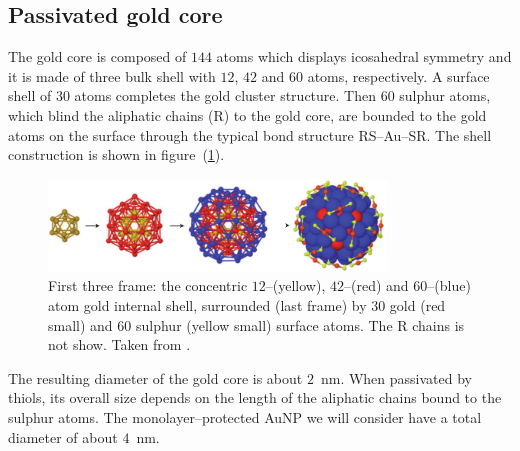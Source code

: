 \subsection{Passivated gold core}
The gold core is composed of $144$ atoms which displays icosahedral symmetry and it is made of three bulk shell with $12$, $42$ and $60$ atoms, respectively. A surface shell of $30$ atoms completes the gold cluster structure. Then $60$ sulphur atoms, which blind the aliphatic chains (R) to the gold core, are bounded to the gold atoms on the surface through the typical bond structure RS--Au--SR. The shell construction is shown in figure~(\ref{fig:goldShell}).
\begin{figure}[!ht]
	\centering
	\includegraphics[width=0.8\textwidth]{./img/goldShell}
	\caption{First three frame: the concentric $12$--(yellow), $42$--(red) and $60$--(blue) atom gold internal shell, surrounded (last frame) by $30$ gold (red small) and $60$ sulphur (yellow small) surface atoms. The R chains is not show. Taken from \cite{corePassivated}.}
	\label{fig:goldShell}
\end{figure}

The resulting diameter of the gold core is about $2$~nm. When passivated by thiols, its overall size depends on the length of the aliphatic chains bound to the sulphur atoms. The monolayer--protected Au\ac{NP} we will consider have a total diameter of about $4$~nm.

